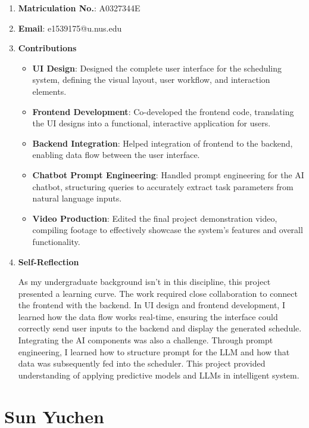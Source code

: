 \documentclass[12pt, a4paper]{article}
\begin{document}
    \begin{enumerate}
        \item \textbf{Matriculation No.}: A0327344E
        \item \textbf{Email}: e1539175@u.nus.edu
        \item \textbf{Contributions}

            \begin{itemize}
                \item \textbf{UI Design}: Designed the complete user interface for the scheduling system, defining the visual layout, user workflow, and interaction elements.
                \item \textbf{Frontend Development}: Co-developed the frontend code, translating the UI designs into a functional, interactive application for users.
                \item \textbf{Backend Integration}: Helped integration of frontend to the backend, enabling data flow between the user interface.
                \item \textbf{Chatbot Prompt Engineering}: Handled prompt engineering for the AI chatbot, structuring queries to accurately extract task parameters from natural language inputs.
                \item \textbf{Video Production}: Edited the final project demonstration video, compiling footage to effectively showcase the system's features and overall functionality.
            \end{itemize}
        
        \item \textbf{Self-Reflection}
        
            As my undergraduate background isn’t in this discipline, this project presented a learning curve. The work required close collaboration to connect the frontend with the backend. In UI design and frontend development, I learned how the data flow works real-time, ensuring the interface could correctly send user inputs to the backend and display the generated schedule. Integrating the AI components was also a challenge. Through prompt engineering, I learned how to structure prompt for the LLM and how that data was subsequently fed into the scheduler. This project provided understanding of applying predictive models and LLMs in intelligent system.
    \end{enumerate}

    

\section{Sun Yuchen} 
\end{document}
